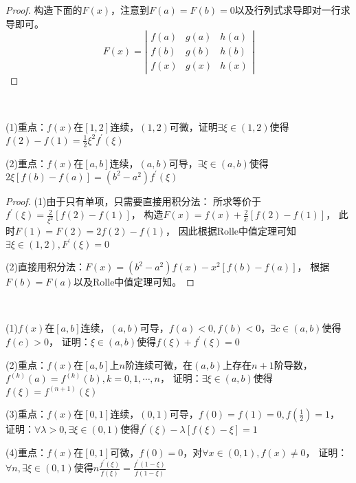 \begin{proof}
  构造下面的$F(x)$，注意到$F(a) = F(b) = 0$以及行列式求导即对一行求导即可。
  \begin{equation*}
  F(x) =   \left|
      \begin{array}{ccc}
        f(a)&g(a)&h(a) \\
        f(b)&g(b)&h(b)\\ 
        f(x)&g(x)&h(x)
      \end{array}
    \right|
  \end{equation*}
\end{proof}

~

\begin{exercise}[直接积分法]
  (1)重点：$f(x)$在$[1,2]$连续，$(1,2)$可微，证明$\exists \xi \in (1,2)$使得$f(2) - f(1) = \frac{1}{2}\xi^2 f^{\prime}(\xi)$

  (2)重点：$f(x)$在$[a,b]$连续，$(a,b)$可导，$\exists \xi \in (a,b)$使得$2\xi [f(b) - f(a)] = (b^2 - a^2)f^{\prime}(\xi)$
\end{exercise}

\begin{proof}
  (1)由于只有单项，只需要直接用积分法：
  所求等价于$f^{\prime}(\xi) = \frac{2}{\xi^2}[f(2) - f(1)]$，
  构造$F(x) = f(x) + \frac{2}{x} [f(2) - f(1)]$，
  此时$F(1) = F(2) = 2f(2) - f(1)$，
  因此根据Rolle中值定理可知$\exists \xi \in (1,2), F^{\prime}(\xi) = 0$

  (2)直接用积分法：$F(x) = (b^2 - a^2)f(x) - x^2 [f(b) - f(a)]$，
  根据$F(b) = F(a)$以及Rolle中值定理可知。
\end{proof}

~

\begin{exercise}[简单的辅助函数法]
  (1)$f(x)$在$[a,b]$连续，$(a,b)$可导，$f(a) < 0, f(b) < 0$，$\exists c \in (a,b)$使得$f(c) > 0$，
  证明：$\xi \in (a,b)$使得$f(\xi) + f^{\prime}(\xi) = 0$

  (2)重点：$f(x)$在$[a,b]$上$n$阶连续可微，在$(a,b)$上存在$n+1$阶导数，$f^{(k)}(a) = f^{(k)}(b), k = 0,1,\cdots,n$，
  证明：$\exists \xi \in (a,b)$使得$f(\xi) = f^{(n+1)}(\xi)$

  (3)重点：$f(x)$在$[0,1]$连续，$(0,1)$可导，$f(0) = f(1) = 0, f(\frac{1}{2}) = 1$，
  证明：$\forall \lambda > 0, \exists \xi \in (0,1)$使得$f^{\prime}(\xi) - \lambda [f(\xi) - \xi] = 1$

  (4)重点：$f(x)$在$[0,1]$可微，$f(0) = 0$，对$\forall x \in (0,1), f(x) \neq 0$，
  证明：$\forall n, \exists \xi \in (0,1)$使得$n \frac{f^{\prime}(\xi)}{f(\xi)} = \frac{f^{\prime}(1 - \xi)}{f(1 - \xi)}$
\end{exercise}

